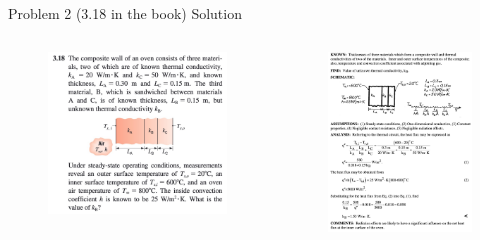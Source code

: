\documentclass[9pt, aspectratio=169, handout]{beamer}
\begin{document}
\begin{frame}{Problem 2 (3.18 in the book) Solution}
    \begin{columns}
        \begin{figure}
            \centering
            \includegraphics[width=\textwidth]{Figures/fig1.2.jpg}
        \end{figure}
        \begin{figure}
            \centering
            \includegraphics[width=.7\textwidth]{Figures/fig1.2_solution.jpg}
        \end{figure}
    \end{columns}
\end{frame}
\end{document}
